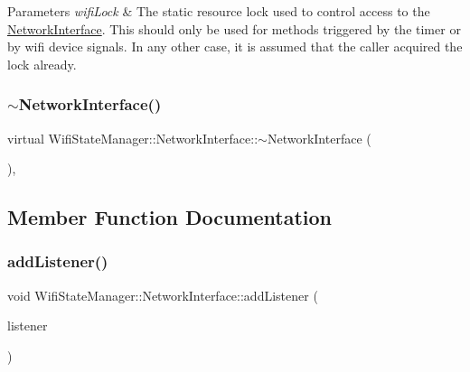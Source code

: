 \begin{DoxyParams}{Parameters}
{\em wifi\+Lock} & The static resource lock used to control access to the \mbox{\hyperlink{classWifiStateManager_1_1NetworkInterface}{Network\+Interface}}. This should only be used for methods triggered by the timer or by wifi device signals. In any other case, it is assumed that the caller acquired the lock already. \\
\hline
\end{DoxyParams}
\mbox{\label{classWifiStateManager_1_1NetworkInterface_a89d73a6b2a7eaf74882501a4e62f2569}} 
\subsubsection{\texorpdfstring{$\sim$\+Network\+Interface()}{~NetworkInterface()}}
{\footnotesize\ttfamily virtual Wifi\+State\+Manager\+::\+Network\+Interface\+::$\sim$\+Network\+Interface (\begin{DoxyParamCaption}{ }\end{DoxyParamCaption})\hspace{0.3cm}{\ttfamily [inline]}, {\ttfamily [virtual]}}



\subsection{Member Function Documentation}
\mbox{\label{classWifiStateManager_1_1NetworkInterface_a10613ea1fe2bfbf47c1605b0eb224fef}} 
\subsubsection{\texorpdfstring{add\+Listener()}{addListener()}}
{\footnotesize\ttfamily void Wifi\+State\+Manager\+::\+Network\+Interface\+::add\+Listener (\begin{DoxyParamCaption}\item[{\mbox{\hyperlink{classWifiStateManager_1_1Listener}{Wifi\+State\+Manager\+::\+Listener}} $\ast$}]{listener }\end{DoxyParamCaption})}

